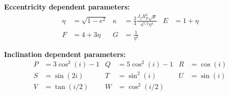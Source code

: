 \vspace{1em}

\noindent
\textbf{Eccentricity dependent parameters:}
\begin{align*}
\eta &= \sqrt{1 - e^2} &
\kappa &= \frac{3}{4} \frac{J_2 R_E^2 \sqrt{\mu}}{a^{7/2} \eta^4} &
E &= 1 + \eta \\
F &= 4 + 3\eta &
G &= \frac{1}{\eta^2}
\end{align*}

\vspace{1em}

\noindent
\textbf{Inclination dependent parameters:}
\begin{align*}
P &= 3\cos^2(i) - 1 &
Q &= 5\cos^2(i) - 1 &
R &= \cos(i) \\
S &= \sin(2i) &
T &= \sin^2(i) &
U &= \sin(i) \\
V &= \tan(i/2) &
W &= \cos^2(i/2)
\end{align*}

\cite{koenig2017new}